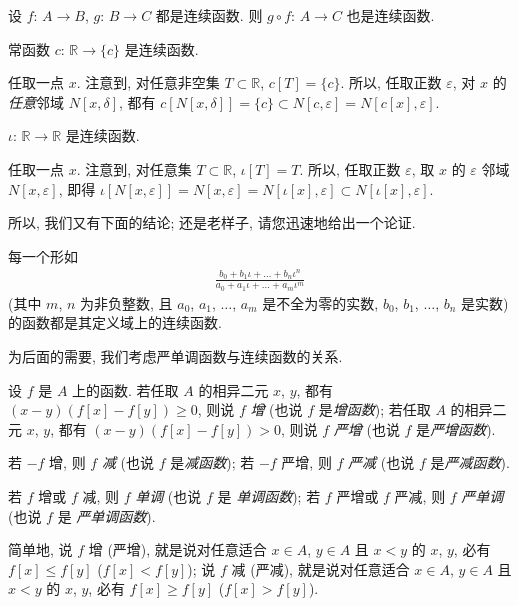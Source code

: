 \begin{theorem}
    设 $f$: $A \to B$, $g$: $B \to C$ 都是连续函数. 则 $g \circ f$: $A \to C$ 也是连续函数.
\end{theorem}

\begin{example}
    常函数 $c$: $\mathbb{R} \to \{ c \}$ 是连续函数.

    任取一点 $x$. 注意到, 对任意非空集 $T \subset \mathbb{R}$, $c[T] = \{ c \}$. 所以, 任取正数 $\varepsilon$, 对 $x$ 的\emph{任意}邻域 $N[x, \delta]$, 都有 $c[N[x, \delta]] = \{ c \} \subset N[c, \varepsilon] = N[c[x], \varepsilon]$.
\end{example}

\begin{example}
    $\iota$: $\mathbb{R} \to \mathbb{R}$ 是连续函数.

    任取一点 $x$. 注意到, 对任意集 $T \subset \mathbb{R}$, $\iota[T] = T$. 所以, 任取正数 $\varepsilon$, 取 $x$ 的 $\varepsilon$ 邻域 $N[x, \varepsilon]$, 即得 $\iota[N[x, \varepsilon]] = N[x, \varepsilon] = N[\iota[x], \varepsilon] \subset N[\iota[x], \varepsilon]$.
\end{example}

所以, 我们又有下面的结论; 还是老样子, 请您迅速地给出一个论证.

\begin{theorem}
    每一个形如
    \begin{align*}
        \frac{b_0 + b_1 \iota + \dots + b_n \iota^n}{a_0 + a_1 \iota + \dots + a_m \iota^m}
    \end{align*}
    (其中 $m$, $n$ 为非负整数, 且 $a_0$, $a_1$, $\dots$, $a_m$ 是不全为零的实数, $b_0$, $b_1$, $\dots$, $b_n$ 是实数) 的函数都是其定义域上的连续函数.
\end{theorem}

为后面的需要, 我们考虑严单调函数与连续函数的关系.

\begin{definition}
    设 $f$ 是 $A$ 上的函数. 若任取 $A$ 的相异二元 $x$, $y$, 都有 $(x - y)(f[x] - f[y]) \geq 0$, 则说 $f$ \emph{增} (也说 $f$ 是\emph{增函数}); 若任取 $A$ 的相异二元 $x$, $y$, 都有 $(x - y)(f[x] - f[y]) > 0$, 则说 $f$ \emph{严增} (也说 $f$ 是\emph{严增函数}).

    若 $-f$ 增, 则 $f$ \emph{减} (也说 $f$ 是\emph{减函数}); 若 $-f$ 严增, 则 $f$ \emph{严减} (也说 $f$ 是\emph{严减函数}).

    若 $f$ 增或 $f$ 减, 则 $f$ \emph{单调} (也说 $f$ 是 \emph{单调函数}); 若 $f$ 严增或 $f$ 严减, 则 $f$ \emph{严单调} (也说 $f$ 是 \emph{严单调函数}).
\end{definition}

简单地, 说 $f$ 增 (严增), 就是说对任意适合 $x \in A$, $y \in A$ 且 $x < y$ 的 $x$, $y$, 必有 $f[x] \leq f[y]$ ($f[x] < f[y]$); 说 $f$ 减 (严减), 就是说对任意适合 $x \in A$, $y \in A$ 且 $x < y$ 的 $x$, $y$, 必有 $f[x] \geq f[y]$ ($f[x] > f[y]$).
